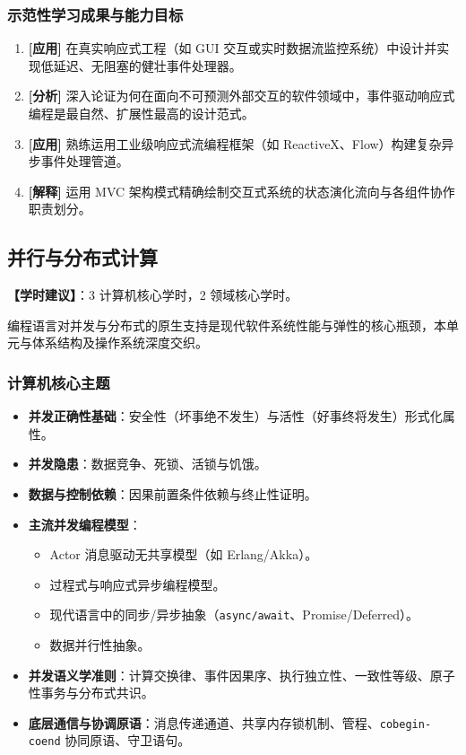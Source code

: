\subsubsection{示范性学习成果与能力目标}
\begin{enumerate}
    \item \textbf{[应用]} 在真实响应式工程（如 GUI 交互或实时数据流监控系统）中设计并实现低延迟、无阻塞的健壮事件处理器。
    \item \textbf{[分析]} 深入论证为何在面向不可预测外部交互的软件领域中，事件驱动响应式编程是最自然、扩展性最高的设计范式。
    \item \textbf{[应用]} 熟练运用工业级响应式流编程框架（如 ReactiveX、Flow）构建复杂异步事件处理管道。
    \item \textbf{[解释]} 运用 MVC 架构模式精确绘制交互式系统的状态演化流向与各组件协作职责划分。
\end{enumerate}

\subsection{并行与分布式计算}
\textbf{【学时建议】}：3 计算机核心学时，2 领域核心学时。

编程语言对并发与分布式的原生支持是现代软件系统性能与弹性的核心瓶颈，本单元与体系结构及操作系统深度交织。

\subsubsection{计算机核心主题}
\begin{itemize}
    \item \textbf{并发正确性基础}：安全性（坏事绝不发生）与活性（好事终将发生）形式化属性。
    \item \textbf{并发隐患}：数据竞争、死锁、活锁与饥饿。
    \item \textbf{数据与控制依赖}：因果前置条件依赖与终止性证明。
    \item \textbf{主流并发编程模型}：
    \begin{itemize}
        \item Actor 消息驱动无共享模型（如 Erlang/Akka）。
        \item 过程式与响应式异步编程模型。
        \item 现代语言中的同步/异步抽象（\texttt{async/await}、Promise/Deferred）。
        \item 数据并行性抽象。
    \end{itemize}
    \item \textbf{并发语义学准则}：计算交换律、事件因果序、执行独立性、一致性等级、原子性事务与分布式共识。
    \item \textbf{底层通信与协调原语}：消息传递通道、共享内存锁机制、管程、\texttt{cobegin-coend} 协同原语、守卫语句。
\end{itemize}

